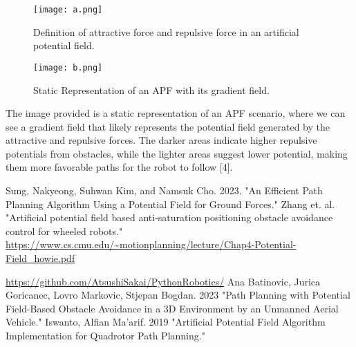 \documentclass{article}
\begin{document}
\begin{figure}[h!]
  \centering
  \begin{minipage}{0.48\textwidth}
    \centering
    \texttt{[image: a.png]} 
    \caption{Definition of attractive force and repulsive force in an artificial potential field.}
    \label{fig:image1}
  \end{minipage}\hfill 
  \begin{minipage}{0.48\textwidth}
    \centering
    \texttt{[image: b.png]} 
    \caption{Static Representation of an APF with its gradient field.}
    \label{fig:image2}
  \end{minipage}
\end{figure}

The image provided is a static representation of an APF scenario, where we can see a gradient field that likely represents the potential field generated by the attractive and repulsive forces. The darker areas indicate higher repulsive potentials from obstacles, while the lighter areas suggest lower potential, making them more favorable paths for the robot to follow [4].



\begin{thebibliography}{9}
 Sung, Nakyeong, Suhwan Kim, and Namsuk Cho. 2023. "An Efficient Path Planning Algorithm Using a Potential Field for Ground Forces."
 Zhang et. al. "Artificial potential field based anti-saturation positioning obstacle avoidance control for wheeled robots."
 \url{https://www.cs.cmu.edu/~motionplanning/lecture/Chap4-Potential-Field_howie.pdf}

 \url{https://github.com/AtsushiSakai/PythonRobotics/}
 Ana Batinovic, Jurica Goricanec, Lovro Markovic, Stjepan Bogdan. 2023 "Path Planning with Potential Field-Based Obstacle Avoidance in a 3D Environment by an Unmanned Aerial Vehicle."
 Iswanto, Alfian Ma'arif. 2019 "Artificial Potential Field Algorithm Implementation for Quadrotor Path Planning."
\end{thebibliography}
\end{document}
